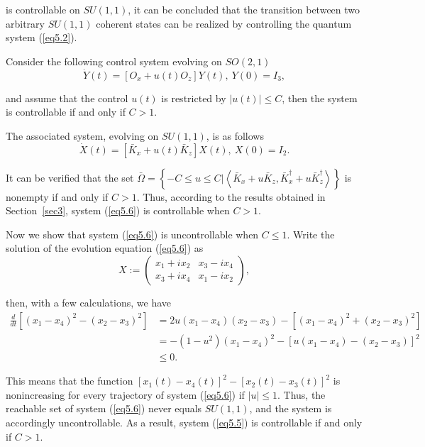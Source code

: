 \documentclass[onecolumn,showpacs,showkeys,preprintnumbers]{revtex4}
\begin{document}
\noindent is controllable on $SU(1,1)$, it can be concluded that
the transition between two arbitrary $SU(1,1)$ coherent states can
be realized by controlling the quantum system (\ref{eq5.2}).

 Consider the following control system
evolving on $SO(2,1)$~\cite{Jurdjevic2}\noindent\begin{equation}\label{eq5.5}\dot{Y}(t)=[O_x+u(t)O_z]Y(t),~Y(0)=I_3,\end{equation}

\noindent and assume that the control $u(t)$ is restricted by
$|u(t)|{\leq}C$, then the system is controllable if and only if
$C>1$.

The associated system, evolving on $SU(1,1)$, is as follows
\noindent\begin{equation}\label{eq5.6}\dot{X}(t)=[\bar{K}_x+u(t)\bar{K}_z]X(t),~X(0)=I_2.\end{equation}

\noindent It can be verified that the set
$\bar{\Omega}=\left\{-C{\leq}u{\leq}C|\left<\bar{K}_x+u\bar{K}_z,\bar{K}_x^\dag+u\bar{K}_z^\dag\right>\right\}$
is nonempty if and only if $C>1$. Thus, according to the results
obtained in Section~\ref{sec3}, system (\ref{eq5.6}) is
controllable when $C>1$.

Now we show that system (\ref{eq5.6}) is uncontrollable when
$C{\leq}1$. Write the solution of the evolution equation
(\ref{eq5.6}) as\noindent\begin{equation}\label{eq5.7}
X:=\left(\begin{array}{cc}
  x_1+ix_2 & x_3-ix_4 \\
  x_3+ix_4 & x_1-ix_2
\end{array}\right),
\end{equation}

\noindent then, with a few calculations, we have\noindent\begin{equation}\label{eq5.8}
\begin{split}
  \frac{d}{dt}[(x_1-x_4)^2-(x_2-x_3)^2]&=2u(x_1-x_4)(x_2-x_3)-[(x_1-x_4)^2+(x_2-x_3)^2] \\
  &=-(1-u^2)(x_1-x_4)^2-[u(x_1-x_4)-(x_2-x_3)]^2\\
  &\leq0.
\end{split}
\end{equation}

\noindent This means that the function
$[x_1(t)-x_4(t)]^2-[x_2(t)-x_3(t)]^2$ is nonincreasing for every
trajectory of system (\ref{eq5.6}) if $|u|{\leq}1$. Thus, the
reachable set of system (\ref{eq5.6}) never equals $SU(1,1)$, and
the system is accordingly uncontrollable. As a result, system
(\ref{eq5.5}) is controllable if and only if $C>1$.
\end{document}

